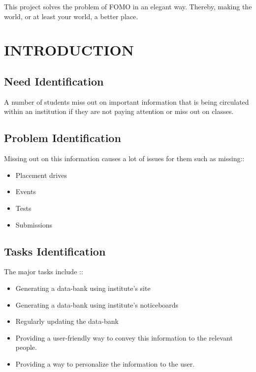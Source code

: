 \documentclass[14pt]{extarticle}
\newcommand\mainmatter{
    \cleardoublepage
    \pagenumbering{arabic}
}
\begin{document}
This project solves the problem of FOMO in an elegant way. Thereby, making the world, or at least your world, a better place.

\mainmatter

\setlength{\parskip}{1em}

\newpage
\section{INTRODUCTION}

\subsection{Need Identification}

A number of students miss out on important information that is being circulated within an institution if they are not paying attention or miss out on classes.

\subsection{Problem Identification}

Missing out on this information causes a lot of issues for them such as missing:: \\
\vspace*{-3em}
\begin{itemize}
    \item Placement drives
    \item Events
    \item Tests
    \item Submissions
\end{itemize}

\subsection{Tasks Identification}

The major tasks include ::
\vspace*{-1.5em}
\begin{itemize}
    \item Generating a data-bank using institute's site
    \item Generating a data-bank using institute's noticeboards
    \item Regularly updating the data-bank
    \item Providing a user-friendly way to convey this information to the relevant people.
    \item Providing a way to personalize the information to the user.
\end{itemize}
\end{document}
